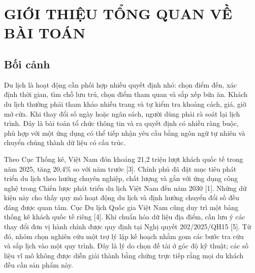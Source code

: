 \documentclass[12pt,a4paper,oneside]{report}
\begin{document}
\tableofcontents
\listoffigures
\listoftables
\clearpage
{}

\chapter{GIỚI THIỆU TỔNG QUAN VỀ BÀI TOÁN}

\section{Bối cảnh}
Du lịch là hoạt động cần phối hợp nhiều quyết định nhỏ: chọn điểm đến, xác định thời gian, tìm chỗ lưu trú, chọn điểm tham quan và sắp xếp bữa ăn. Khách du lịch thường phải tham khảo nhiều trang và tự kiểm tra khoảng cách, giá, giờ mở cửa. Khi thay đổi số ngày hoặc ngân sách, người dùng phải rà soát lại lịch trình. Đây là bài toán tổ chức thông tin và ra quyết định có nhiều ràng buộc, phù hợp với một ứng dụng có thể tiếp nhận yêu cầu bằng ngôn ngữ tự nhiên và chuyển chúng thành dữ liệu có cấu trúc.

Theo Cục Thống kê, Việt Nam đón khoảng 21,2 triệu lượt khách quốc tế trong năm 2025, tăng 20,4\% so với năm trước [3]. Chính phủ đã đặt mục tiêu phát triển du lịch theo hướng chuyên nghiệp, chất lượng và gắn với ứng dụng công nghệ trong Chiến lược phát triển du lịch Việt Nam đến năm 2030 [1]. Những dữ kiện này cho thấy quy mô hoạt động du lịch và định hướng chuyển đổi số đều đáng được quan tâm. Cục Du lịch Quốc gia Việt Nam cũng duy trì một bảng thống kê khách quốc tế riêng [4]. Khi chuẩn hóa dữ liệu địa điểm, cần lưu ý các thay đổi đơn vị hành chính được quy định tại Nghị quyết 202/2025/QH15 [5]. Từ đó, nhóm chọn nghiên cứu một trợ lý lập kế hoạch nhằm gom các bước tra cứu và sắp lịch vào một quy trình. Đây là lý do chọn đề tài ở góc độ kỹ thuật; các số liệu vĩ mô không được diễn giải thành bằng chứng trực tiếp rằng mọi du khách đều cần sản phẩm này.
\end{document}
